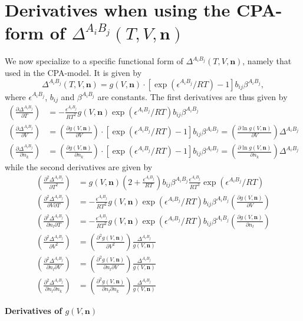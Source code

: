\documentclass[10pt, a4paper]{article}
\newcommand{\mbf}[0]{\mathbf}
\newcommand*{\pder}[2]{\left(\frac{\partial #1}{\partial #2}\right)}
\newcommand*{\pdder}[2]{\left(\frac{\partial^2 #1}{\partial #2^2}\right)}
\newcommand*{\pdcross}[3]{\left(\frac{\partial^2 #1}{\partial #2 \partial #3}\right)}
\newcommand{\lp}{\left(}
\newcommand{\rp}{\right)}
\begin{document}
\section{Derivatives when using the CPA-form of $\Delta^{A_i B_j}(T,V,\mbf n)$}
We now specialize to a specific functional form of $\Delta^{A_i B_j}(T,V,\mbf n)$, namely that used in the CPA-model. It is given by
\begin{equation}
  \Delta^{A_i B_j}(T,V,\mbf n) = g(V,\mbf n) \cdot [\exp(\epsilon^{A_i B_j}/RT) - 1] b_{ij} \beta^{A_i B_j},
\end{equation}
where $\epsilon^{A_i B_j}$, $b_{ij}$ and $\beta^{A_i B_j}$ are constants. The first derivatives are thus given by
\begin{align}
  \pder{\Delta^{A_i B_j}}{T}   &= -\frac{\epsilon^{A_i B_j}}{RT^2} g(V,\mbf n) \exp(\epsilon^{A_i B_j}/RT) b_{ij} \beta^{A_i B_j} \\
  \pder{\Delta^{A_i B_j}}{V}   &= \pder{g(V,\mbf n)}{V} \cdot [\exp(\epsilon^{A_i B_j}/RT) - 1] b_{ij} \beta^{A_i B_j}  = \pder{\ln g(V,\mbf n)}{V} \Delta^{A_i B_j} \\
  \pder{\Delta^{A_i B_j}}{n_k} &= \pder{g(V,\mbf n)}{n_k} \cdot [\exp(\epsilon^{A_i B_j}/RT) - 1] b_{ij} \beta^{A_i B_j} =  \pder{\ln g(V,\mbf n)}{n_k} \Delta^{A_i B_j}
\end{align}
while the second derivatives are given by
\begin{align}
  \pdder{\Delta^{A_i B_j}}{T}   &=  g(V,\mbf n) \lp 2 + \frac{\epsilon^{A_i B_j}}{RT} \rp b_{ij} \beta^{A_i B_j} \frac{\epsilon^{A_i B_j}}{RT^3} \exp(\epsilon^{A_i B_j}/RT) \\
  \pdcross{\Delta^{A_i B_j}}{V}{T}   &= -\frac{\epsilon^{A_i B_j}}{RT^2} g(V,\mbf n) \exp(\epsilon^{A_i B_j}/RT) b_{ij} \beta^{A_i B_j} \pder{g(V,\mbf n)}{V} \\
  \pdcross{\Delta^{A_i B_j}}{n_l}{T}   &= -\frac{\epsilon^{A_i B_j}}{RT^2} g(V,\mbf n) \exp(\epsilon^{A_i B_j}/RT) b_{ij} \beta^{A_i B_j} \pder{g(V,\mbf n)}{n_l} \\
  \pdder{\Delta^{A_i B_j}}{V}   &= \pdder{g(V,\mbf n)}{V}  \frac{\Delta^{A_i B_j}}{g(V,\mbf n)} \\
  \pdcross{\Delta^{A_i B_j}}{n_l}{V}  &= \pdcross{g(V,\mbf n)}{n_l}{V} \frac{\Delta^{A_i B_j}}{g(V,\mbf n)} \\
  \pdcross{\Delta^{A_i B_j}}{n_l}{n_k}  &= \pdcross{g(V,\mbf n)}{n_l}{n_k} \frac{\Delta^{A_i B_j}}{g(V,\mbf n)} 
\end{align}

\textbf{Derivatives of $g(V,\mbf n)$}
\end{document}
